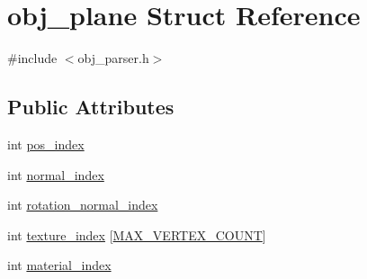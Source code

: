 \hypertarget{structobj__plane}{\section{obj\+\_\+plane Struct Reference}
\label{structobj__plane}
}


{\ttfamily \#include $<$obj\+\_\+parser.\+h$>$}

\subsection*{Public Attributes}
\begin{DoxyCompactItemize}
\item 
int \hyperlink{structobj__plane_abaa3eff0fff8deaa67eb4be6869b7048}{pos\+\_\+index}
\item 
int \hyperlink{structobj__plane_acf720ed71df9e09ab0797d61ffdf7663}{normal\+\_\+index}
\item 
int \hyperlink{structobj__plane_a0c0c054b3a747f4ec2486fdf367efa36}{rotation\+\_\+normal\+\_\+index}
\item 
int \hyperlink{structobj__plane_a38a87ad9ef6583b136c8438c2bd4229b}{texture\+\_\+index} \mbox{[}\hyperlink{obj__parser_8h_acbf8be5cb832d11ce1584c3024d2a569}{M\+A\+X\+\_\+\+V\+E\+R\+T\+E\+X\+\_\+\+C\+O\+U\+N\+T}\mbox{]}
\item 
int \hyperlink{structobj__plane_ae0783771277bc7c8b2b8743015104291}{material\+\_\+index}
\end{DoxyCompactItemize}


